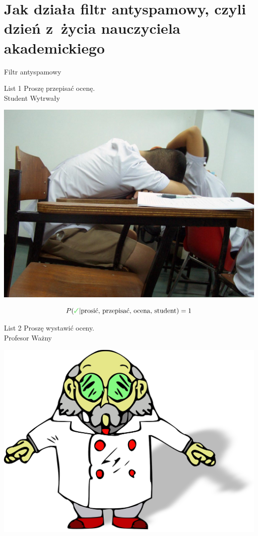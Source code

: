 \documentclass{beamer}
\newcommand{\cmark}{\textcolor{green!80!black!50}{\text{\ding{51}}}}
\begin{document}
\part{Jak działa filtr antyspamowy, czyli dzień z~życia nauczyciela akademickiego}
\frame{\partpage}
\begin{frame}{Filtr antyspamowy}
{
	\begin{minipage}{.50\textwidth}
\begin{block}{List 1}
Proszę przepisać ocenę.\\
Student Wytrwały
\end{block}
\end{minipage}
\hfill
\begin{minipage}{.45\textwidth}
\includegraphics[width=\textwidth]{bayes/Sleeping_students.jpg}\\
\end{minipage}
\[ P(\cmark | \text{prosić, przepisać, ocena, student})=1 \]
}
{
	\begin{minipage}{.50\textwidth}
\begin{block}{List 2}
Proszę wystawić oceny.\\
Profesor Ważny
\end{block}
\end{minipage}
\hfill
\begin{minipage}{.45\textwidth}
\includegraphics[width=\textwidth]{bayes/scientist-28748_1280.png}\\

\end{minipage}}
\end{frame}
\end{document}
